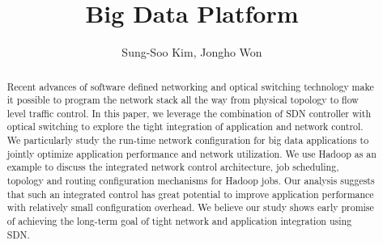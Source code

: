 \documentclass[runningheads,a4paper]{llncs}
\begin{document}
\mainmatter  %

\title{Big Data Platform}


%
%
\author{
Sung-Soo Kim, Jongho Won
}

%


%
%

\maketitle


\begin{abstract}
Recent advances of software defined networking and optical switching technology make it possible to program the network stack all the way from physical topology to flow level traffic control. In this paper, we leverage the combination of SDN controller with optical switching to explore the tight integration of application and network control. We particularly study the run-time network configuration for big data applications to jointly optimize application performance and network utilization. We use Hadoop as an example to discuss the integrated network control architecture, job scheduling, topology and routing configuration mechanisms for Hadoop jobs. Our analysis suggests that such an integrated control has great potential to improve application performance with relatively small configuration overhead. We believe our study shows early promise of achieving the long-term goal of tight network and application integration using SDN.
\end{abstract}
\end{document}
